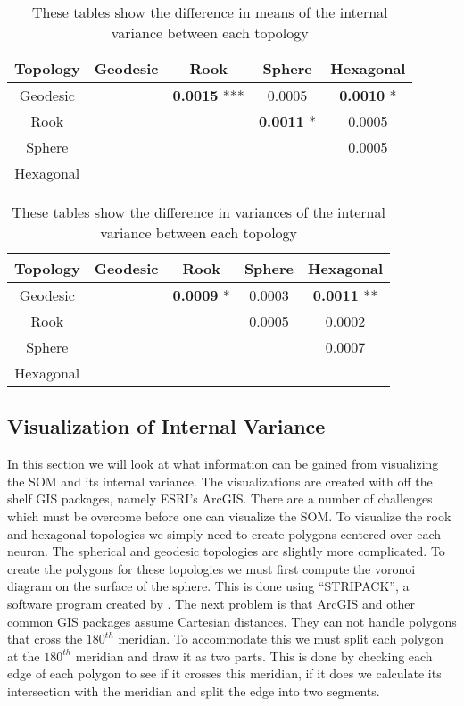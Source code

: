 \begin{table}[hbt]
  \centering
  \caption{These tables show the difference in means of the internal variance between each topology}
  \label{rlt:all}
  \begin{tabular}{|c||c|c|c|c|}
  \hline
  \textbf{Topology}&Geodesic &Rook	&Sphere			&Hexagonal		\\\hline
  \hline
  Geodesic	&& \textbf{0.0015} ***	& 0.0005		& \textbf{0.0010} *	\\\hline
  Rook		&& 			& \textbf{0.0011} *	& 0.0005		\\\hline
  Sphere	&& 			& 			& 0.0005 		\\\hline
  Hexagonal 	&& 			& 			&			\\\hline
  \end{tabular}
  \end{table}




\begin{table}[hbt]
  \centering
  \caption{These tables show the difference in variances of the internal variance between each topology}
  \label{rlt:allV}
  \begin{tabular}{|c||c|c|c|c|}
  \hline
  \textbf{Topology}&Geodesic &Rook	&Sphere			&Hexagonal		\\\hline
  \hline
  Geodesic	&& \textbf{0.0009} *	& 0.0003		& \textbf{0.0011} **	\\\hline
  Rook		&& 			& 0.0005		& 0.0002		\\\hline
  Sphere	&& 			& 			& 0.0007 		\\\hline
  Hexagonal 	&& 			& 			&			\\\hline
  \end{tabular}
  \end{table}



\subsection{Visualization of Internal Variance}
In this section we will look at what information can be gained from
visualizing the SOM and its internal variance. The visualizations are created
with off the shelf GIS packages, namely ESRI's ArcGIS.  There are a number of
challenges which must be overcome before one can visualize the SOM.  To
visualize the rook and hexagonal topologies we simply need to create polygons
centered over each neuron.  The spherical and geodesic topologies are slightly
more complicated.  To create the polygons for these topologies we must first
compute the voronoi diagram on the surface of the sphere.  This is done using
``STRIPACK'', a software program created by \cite{Ranka97}.  The next problem
is that ArcGIS and other common GIS packages assume Cartesian distances.  They
can not handle polygons that cross the $180^{th}$ meridian.  To accommodate this we
must split each polygon at the $180^{th}$ meridian and draw it as two parts.  This
is done by checking each edge of each polygon to see if it crosses this
meridian, if it does we calculate its intersection with the meridian and split
the edge into two segments.

